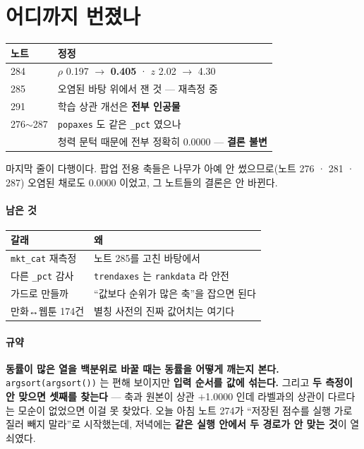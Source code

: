 \documentclass[10pt]{article}
\begin{document}
\section{어디까지 번졌나}

\begin{center}\small
\begin{tabular}{ll}
\hline
노트 & 정정 \\
\hline
284 & $\rho$ 0.197 $\to$ \textbf{0.405} · $z$ 2.02 $\to$ 4.30 \\
285 & 오염된 바탕 위에서 잰 것 --- 재측정 중 \\
291 & 학습 상관 개선은 \textbf{전부 인공물} \\
276$\sim$287 & \texttt{popaxes} 도 같은 \texttt{\_pct} 였으나 \\
& 청력 문턱 때문에 전부 정확히 0.0000 --- \textbf{결론 불변} \\
\hline
\end{tabular}
\end{center}

마지막 줄이 다행이다. 팝업 전용 축들은 나무가 아예 안 썼으므로(노트 276 ·
281 · 287) 오염된 채로도 0.0000 이었고, 그 노트들의 결론은 안 바뀐다.

\paragraph{남은 것}
\begin{center}\small
\begin{tabular}{ll}
\hline
갈래 & 왜 \\
\hline
\texttt{mkt\_cat} 재측정 & 노트 285를 고친 바탕에서 \\
다른 \texttt{\_pct} 감사 & \texttt{trendaxes} 는 \texttt{rankdata} 라 안전 \\
가드로 만들까 & ``값보다 순위가 많은 축''을 잡으면 된다 \\
만화↔웹툰 174건 & 별칭 사전의 진짜 값어치는 여기다 \\
\hline
\end{tabular}
\end{center}

\paragraph{규약} \textbf{동률이 많은 열을 백분위로 바꿀 때는 동률을 어떻게
깨는지 본다.} \texttt{argsort(argsort())} 는 편해 보이지만 \textbf{입력 순서를
값에 섞는다.} 그리고 \textbf{두 측정이 안 맞으면 셋째를 찾는다} --- 축과
원본이 상관 $+$1.0000 인데 라벨과의 상관이 다르다는 모순이 없었으면 이걸
못 찾았다. 오늘 아침 노트 274가 ``저장된 점수를 실행 가로질러 빼지 말라''로
시작했는데, 저녁에는 \textbf{같은 실행 안에서 두 경로가 안 맞는 것}이 열쇠였다.
\end{document}
